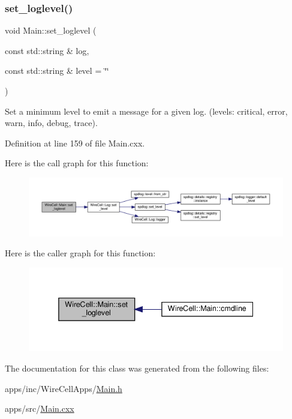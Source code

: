 \subsubsection{\texorpdfstring{set\+\_\+loglevel()}{set\_loglevel()}}
{\footnotesize\ttfamily void Main\+::set\+\_\+loglevel (\begin{DoxyParamCaption}\item[{const std\+::string \&}]{log,  }\item[{const std\+::string \&}]{level = {\ttfamily \char`\"{}\char`\"{}} }\end{DoxyParamCaption})}

Set a minimum level to emit a message for a given log. (levels\+: critical, error, warn, info, debug, trace). 

Definition at line 159 of file Main.\+cxx.

Here is the call graph for this function\+:
\nopagebreak
\begin{figure}[H]
\begin{center}
\leavevmode
\includegraphics[width=350pt]{class_wire_cell_1_1_main_a2b649ad950c80a65798687e79b6bf7bd_cgraph}
\end{center}
\end{figure}
Here is the caller graph for this function\+:
\nopagebreak
\begin{figure}[H]
\begin{center}
\leavevmode
\includegraphics[width=338pt]{class_wire_cell_1_1_main_a2b649ad950c80a65798687e79b6bf7bd_icgraph}
\end{center}
\end{figure}


The documentation for this class was generated from the following files\+:\begin{DoxyCompactItemize}
\item 
apps/inc/\+Wire\+Cell\+Apps/\hyperlink{_main_8h}{Main.\+h}\item 
apps/src/\hyperlink{_main_8cxx}{Main.\+cxx}\end{DoxyCompactItemize}
